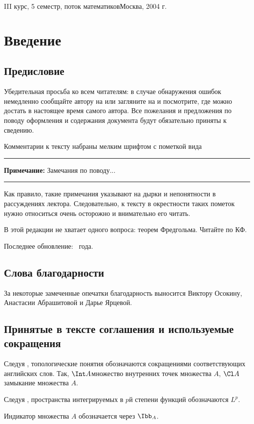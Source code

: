 \documentclass[a4paper]{article}
\newcommand{\comment}[1]{\par\vskip2pt\hrule\vskip2pt{\footnotesize \textbf{Примечание:} #1\par}\vskip2pt\hrule\vskip2pt}
\begin{document}
{III курс, 5 семестр, поток математиков}{Москва, 2004 г.} \pagebreak

\pagestyle{plain}
\tableofcontents
\pagebreak

\section*{Введение}

\subsection*{Предисловие}

Убедительная просьба ко всем читателям: в случае обнаружения ошибок
немедленно сообщайте автору на \dmvnmail{} или загляните на \dmvnwebsite{} и посмотрите, где
можно достать в настоящее время самого автора. Все пожелания и предложения по поводу оформления
и содержания документа будут обязательно приняты к сведению.

Комментарии к тексту набраны мелким шрифтом с пометкой вида
\comment{Замечания по поводу...}
Как правило, такие примечания указывают на дырки и непонятности
в рассуждениях лектора. Следовательно, к тексту в окрестности таких
пометок нужно относиться очень осторожно и внимательно его читать.

В этой редакции не хватает одного вопроса: теорем Фредгольма. Читайте по КФ.

Последнее обновление: ~года.

\subsection*{Слова благодарности}

За некоторые замеченные опечатки благодарность выносится Виктору Осокину, Анастасии Абрашитовой и Дарье Ярцевой.

\subsection*{Принятые в тексте соглашения и используемые сокращения}

\begin{points}{-3}
\item Следуя \cite{rokhlin}, топологические понятия обозначаются сокращениями соответствующих английских слов.
      Так, $\Int A$\т множество внутренних точек множества $A$, $\Cl A$\т замыкание множества $A$.
\item Следуя \cite{bogachev}, пространства интегрируемых в $p$\д й степени функций обозначаются $L^p$.
\item Индикатор множества $A$ обозначается через $\Ibb_A$.

\end{points}
\end{document}
